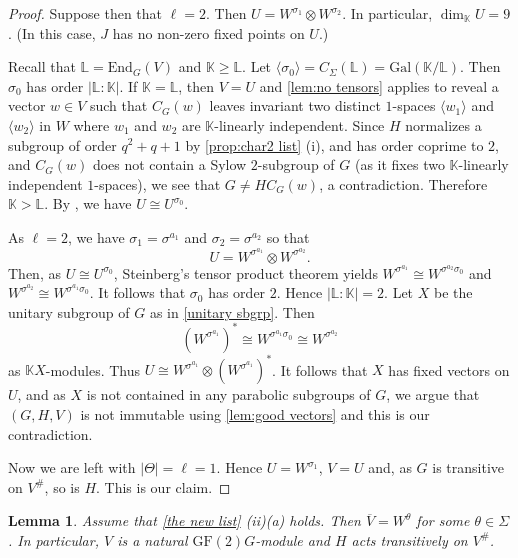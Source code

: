 \documentclass[12pt]{amsart}
\newtheorem{lemma}[theorem]{Lemma}
\theoremstyle{remark}
\theoremstyle{notation}
\theoremstyle{definition}
\newcommand{\GF}{\mathrm{GF}}
\newcommand{\0}{\emptyset}
\begin{document}
\begin{proof}
Suppose then that $\ell=2$.  Then $U= W^{\sigma_1}\otimes W^{\sigma_2}$. In particular, $\dim_{\mathbb K} U=9$.
(In this case,   $J$ has no non-zero fixed points on $U$.)

Recall that $\mathbb L=\mathrm{End}_{G}(V)$ and  $\mathbb K \ge \mathbb L$.
  Let  $\langle \sigma_0\rangle=C_\Sigma(\mathbb L) =\mathrm{Gal}(\mathbb K/\mathbb L )$. Then $\sigma_0$ has order $|\mathbb L :\mathbb K |$. If $\mathbb K = \mathbb L$, then $V=U$ and \cref{lem:no tensors} applies to reveal a vector $w\in V$ such that $C_G(w)$ leaves invariant  two distinct $1$-spaces $\langle w_1\rangle$ and $\langle w_2\rangle$ in $W$ where $w_1$ and $w_2$ are $\mathbb K$-linearly independent. Since $H$ normalizes a subgroup of order $q^{2}+q+1$ by \cref{prop:char2 list} (i), and has order coprime to $2$, and $C_G(w)$ does not contain a Sylow $2$-subgroup of $G$ (as it fixes two $\mathbb K$-linearly independent $1$-spaces), we see that $G\ne HC_G(w)$, a contradiction. Therefore $\mathbb K > \mathbb L$.
By \cite[(26.3)(3)]{AschbacherFG}, we have $U \cong U^{\sigma_0}$.

As $\ell=2$, we   have $\sigma_1=\sigma^{a_1}$ and $\sigma_2=\sigma^{a_2}$ so that $$U= W^{\sigma^{a_1}} \otimes W^{\sigma^{a_2}}.$$
Then, as $U \cong U^{\sigma_0}$, Steinberg's tensor product theorem yields $W^{\sigma^{a_1}} \cong W^{\sigma^{a_2}\sigma_0} $ and
$W^{\sigma^{a_2}} \cong W^{\sigma^{a_1}\sigma_0} $. It follows that $\sigma_0$ has order $2$. Hence $|\mathbb L :\mathbb K |=2$. Let $X$ be the unitary subgroup of $G$ as in \cref{unitary sbgrp}. Then $$(W^{\sigma^{a_1}})^*\cong  W^{\sigma^{a_1}\sigma_0} \cong W^{\sigma^{a_2}}$$ as $ \mathbb K X$-modules. Thus $U \cong W^{\sigma^{a_1}}\otimes(W^{\sigma^{a_1}})^*$. It follows that $X$ has fixed vectors on $U$, and as $X$ is not contained in any parabolic subgroups of $G$, we argue  that $(G,H,V)$ is not immutable using \cref{lem:good vectors} and this is our contradiction.


 Now we are left with $|\Theta|=\ell =1$. Hence  $U=W^{\sigma_1}$,  $V= U$ and, as $G$ is transitive on $V^\#$, so is $H$.  This is our claim.
\end{proof}









\begin{lemma}\label{case (ii)(a)}
Assume that \cref{the new list} (ii)(a) holds. Then  $\overline V= W^{\theta}$ for some $\theta\in \Sigma$.  In particular, $V$ is a natural $\GF(2)G$-module and $H$ acts transitively on $V^\#$.
\end{lemma}
\end{document}
